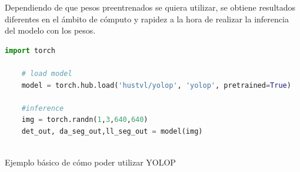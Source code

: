 Dependiendo de que pesos preentrenados se quiera utilizar, se obtiene resultados diferentes en el ámbito de cómputo y rapidez a la hora de 
realizar la inferencia del modelo con los pesos. \newline

\begin{code}[h]
  \begin{lstlisting}[language=Python]
    import torch

    # load model
    model = torch.hub.load('hustvl/yolop', 'yolop', pretrained=True)
    
    #inference
    img = torch.randn(1,3,640,640)
    det_out, da_seg_out,ll_seg_out = model(img)
    
  \end{lstlisting}
  \caption[Cargar modelo YOLOP con pesos preentrenados End-to-end.pth]{Ejemplo básico de cómo poder utilizar YOLOP}
  \label{cod:codejemplo}
  \end{code}  

